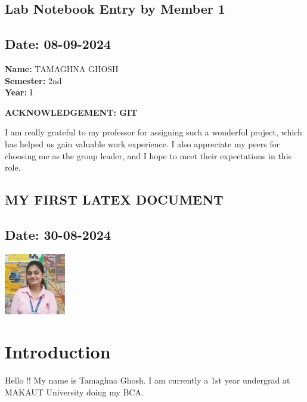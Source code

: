 \documentclass[12pt]{article}
\begin{document}
\subsection*{Lab Notebook Entry by Member 1}
\subsection*{Date: 08-09-2024}

\begin{flushright}
\textbf{Name:} TAMAGHNA GHOSH \\
\textbf{Semester:} 2nd \\
\textbf{Year:} I \\
\end{flushright}

\begin{center}
\Huge \textbf{ACKNOWLEDGEMENT: GIT}
\end{center}

I am really grateful to my professor for assigning such a wonderful project, which has helped us gain valuable work experience. I also appreciate my peers for choosing me as the group leader, and I hope to meet their expectations in this role.
\newpage

\subsection*{MY FIRST LATEX DOCUMENT}
\subsection*{Date: 30-08-2024}

\begin{center}
    \includegraphics[width=0.2\textwidth]{tamaghna.jpg}\\[1cm]
    
\end{center}

\section*{Introduction}
Hello !! My name is Tamaghna Ghosh. I am currently a 1st year undergrad at MAKAUT University doing my BCA.
\end{document}
